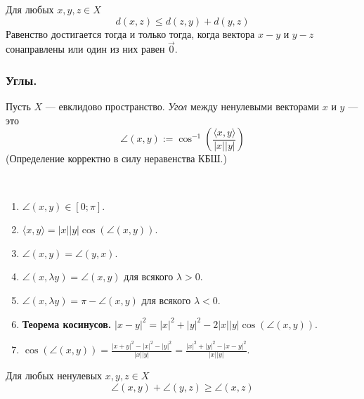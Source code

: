 \documentclass[12pt,a4paper]{article}
\begin{document}
    \begin{corollary}
        Для любых $x, y, z \in X$
        \[d(x, z) \leqslant d(z, y) + d(y, z)\]
        Равенство достигается тогда и только тогда, когда вектора $x - y$ и $y - z$ сонаправлены или один из них равен $\vec{0}$.
    \end{corollary}

    \subsubsection{Углы.}

    \begin{definition}
        Пусть $X$ --- евклидово пространство. \emph{Угол} между ненулевыми векторами $x$ и $y$ --- это
        \[\angle(x, y) := \cos^{-1}\left(\frac{\langle x, y \rangle}{|x| |y|}\right)\]
        (Определение корректно в силу неравенства КБШ.)
    \end{definition}

    \begin{lemma}\ 
        \begin{enumerate}
            \item $\angle(x, y) \in [0; \pi]$.
            \item $\langle x, y \rangle = |x| |y| \cos(\angle(x, y))$.
            \item $\angle(x, y) = \angle(y, x)$.
            \item $\angle(x, \lambda y) = \angle(x, y)$ для всякого $\lambda > 0$.
            \item $\angle(x, \lambda y) = \pi - \angle(x, y)$ для всякого $\lambda < 0$.
            \item \textbf{Теорема косинусов.} $|x-y|^2 = |x|^2 + |y|^2 - 2|x||y|\cos(\angle(x, y))$.
            \item $\cos(\angle(x, y)) = \frac{|x+y|^2 - |x|^2 - |y|^2}{|x||y|} = \frac{|x|^2 + |y|^2 - |x-y|^2}{|x||y|}$.
        \end{enumerate}
    \end{lemma}

    \begin{theorem}
        Для любых ненулевых $x, y, z \in X$
        \[\angle(x, y) + \angle(y, z) \geqslant \angle(x, z)\]
    \end{theorem}
\end{document}
